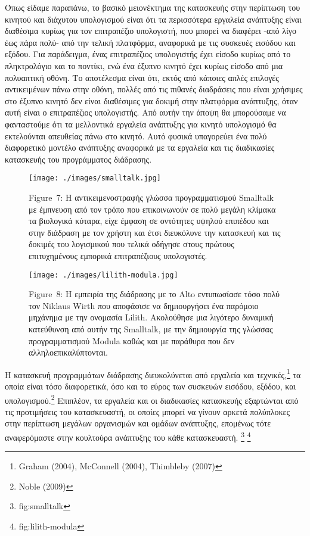 \documentclass[
]{article}
\begin{document}
Όπως είδαμε παραπάνω, το βασικό μειονέκτημα της κατασκευής στην
περίπτωση του κινητού και διάχυτου υπολογισμού είναι ότι τα περισσότερα
εργαλεία ανάπτυξης είναι διαθέσιμα κυρίως για τον επιτραπέζιο
υπολογιστή, που μπορεί να διαφέρει -από λίγο έως πάρα πολύ- από την
τελική πλατφόρμα, αναφορικά με τις συσκευές εισόδου και εξόδου. Για
παράδειγμα, ένας επιτραπέζιος υπολογιστής έχει είσοδο κυρίως από το
πληκτρολόγιο και το ποντίκι, ενώ ένα έξυπνο κινητό έχει κυρίως είσοδο
από μια πολυαπτική οθόνη. Το αποτέλεσμα είναι ότι, εκτός από κάποιες
απλές επιλογές αντικειμένων πάνω στην οθόνη, πολλές από τις πιθανές
διαδράσεις που είναι χρήσιμες στο έξυπνο κινητό δεν είναι διαθέσιμες για
δοκιμή στην πλατφόρμα ανάπτυξης, όταν αυτή είναι ο επιτραπέζιος
υπολογιστής. Από αυτήν την άποψη θα μπορούσαμε να φανταστούμε ότι τα
μελλοντικά εργαλεία ανάπτυξης για κινητό υπολογισμό θα εκτελούνται
απευθείας πάνω στο κινητό. Αυτό φυσικά υπαγορεύει ένα πολύ διαφορετικό
μοντέλο ανάπτυξης αναφορικά με τα εργαλεία και τις διαδικασίες
κατασκευής του προγράμματος διάδρασης.

\leavevmode{}%
\begin{figure}
\hypertarget{fig:smalltalk}{%
\centering
\texttt{[image: ./images/smalltalk.jpg]}
\caption{Figure~7: Η αντικειμενοστραφής γλώσσα προγραμματισμού Smalltalk
με έμπνευση από τον τρόπο που επικοινωνούν σε πολύ μεγάλη κλίμακα τα
βιολογικά κύταρα, είχε έμφαση σε οντότητες υψηλού επιπέδου και στην
διάδραση με τον χρήστη και έτσι διευκόλυνε την κατασκευή και τις δοκιμές
του λογισμικού που τελικά οδήγησε στους πρώτους επιτυχημένους εμπορικά
επιτραπέζιους υπολογιστές.}\label{fig:smalltalk}
}
\end{figure}

\leavevmode{}%
\begin{figure}
\hypertarget{fig:lilith-modula}{%
\centering
\texttt{[image: ./images/lilith-modula.jpg]}
\caption{Figure~8: Η εμπειρία της διάδρασης με το Alto εντυπωσίασε τόσο
πολύ τον Niklaus Wirth που αποφάσισε να δημιουργήσει ένα παρόμοιο
μηχάνημα με την ονομασία Lilith. Ακολούθησε μια λιγότερο δυναμική
κατεύθυνση από αυτήν της Smalltalk, με την δημιουργία της γλώσσας
προγραμματισμού Modula καθώς και με παράθυρα που δεν
αλληλοεπικαλύπτονται.}\label{fig:lilith-modula}
}
\end{figure}

Η κατασκευή προγραμμάτων διάδρασης διευκολύνεται από εργαλεία και
τεχνικές,\footnote{Graham (2004), McConnell (2004), Thimbleby (2007)} τα
οποία είναι τόσο διαφορετικά, όσο και το εύρος των συσκευών εισόδου,
εξόδου, και υπολογισμού.\footnote{Noble (2009)} Επιπλέον, τα εργαλεία
και οι διαδικασίες κατασκευής εξαρτώνται από τις προτιμήσεις του
κατασκευαστή, οι οποίες μπορεί να γίνουν αρκετά πολύπλοκες στην
περίπτωση μεγάλων οργανισμών και ομάδων ανάπτυξης, επομένως τότε
αναφερόμαστε στην κουλτούρα ανάπτυξης του κάθε κατασκευαστή. \footnote{fig:smalltalk}
\footnote{fig:lilith-modula}
\end{document}
